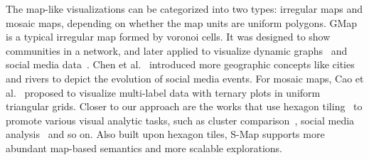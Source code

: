 The map-like visualizations can be categorized into two types: irregular maps and mosaic maps, depending on whether the map units are uniform polygons. GMap~\cite{DBLP:conf/apvis/GansnerHK10} is a typical irregular map formed by voronoi cells. It was designed to show communities in a network, and later applied to visualize dynamic graphs~\cite{DBLP:journals/tvcg/MashimaKH12} and social media data~\cite{DBLP:journals/jgaa/GansnerHN13}. Chen et al.~\cite{chen2017map} introduced more geographic concepts like cities and rivers to depict the evolution of social media events. For mosaic maps, Cao et al.~\cite{DBLP:journals/tvcg/CaoLG16} proposed to visualize multi-label data with ternary plots in uniform triangular grids. Closer to our approach are the works that use hexagon tiling~\cite{DBLP:conf/vinci/YangB15} to promote various visual analytic tasks, such as cluster comparison~\cite{DBLP:journals/cgf/RieckL16}, social media analysis~\cite{DBLP:conf/ieeevast/ChenCWLYCW16} and so on. Also built upon hexagon tiles, S-Map supports more abundant map-based semantics and more scalable explorations.